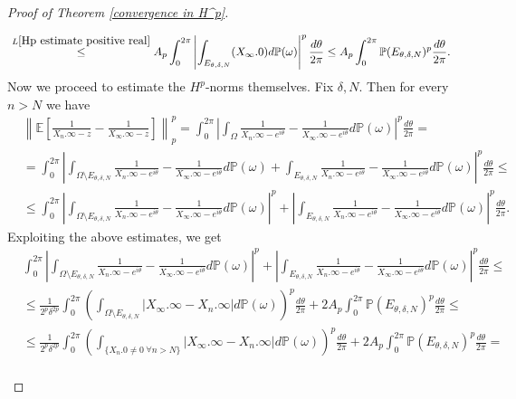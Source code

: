 \documentclass[11pt]{article}
\begin{document}
\begin{proof}[Proof of Theorem \ref{convergence in H^p}]
\begin{itemize}
\[\begin{aligned}
			& \stackrel{L \ref{Hp estimate positive real}}{\le} A_p \int_{0}^{2 \pi} \left| \int_{E_{\theta, \delta, N}} (X_{\infty}.0) d \mathbb{P}(\omega) \right|^p \frac{d\theta}{2 \pi} \le A_p \int_{0}^{2 \pi} \mathbb{P}( E_{\theta, \delta, N})^p \frac{d \theta}{2 \pi}.
		\end{aligned}
		\]
		Now we proceed to estimate the $H^p$-norms themselves. Fix $\delta, N$. Then for every $n > N$ we have
		\[
		\begin{aligned}
			& \left\| \mathbb{E} \left[\frac{1}{X_n.\infty - z} - \frac{1}{X_\infty.\infty - z}\right]  \right\|_p^p = \int_0^{2 \pi} \left| \int_{\Omega} \frac{1}{X_n.\infty - e^{i \theta}} - \frac{1}{X_\infty.\infty - e^{i \theta}} d \mathbb{P}(\omega) \right|^p \frac{d \theta}{2 \pi} = \\
			&= \int_0^{2 \pi} \left| \int_{\Omega \setminus E_{\theta, \delta, N}} \frac{1}{X_n.\infty - e^{i \theta}} - \frac{1}{X_\infty.\infty - e^{i \theta}} d \mathbb{P}(\omega) + \int_{E_{\theta, \delta, N}} \frac{1}{X_n.\infty - e^{i \theta}} - \frac{1}{X_\infty.\infty - e^{i \theta}} d \mathbb{P}(\omega) \right|^p \frac{d \theta}{2 \pi} \le \\
			& \le \int_0^{2 \pi} \left| \int_{\Omega \setminus E_{\theta, \delta, N}} \frac{1}{X_n.\infty - e^{i \theta}} - \frac{1}{X_\infty.\infty - e^{i \theta}} d \mathbb{P}(\omega) \right|^p + \left| \int_{E_{\theta, \delta, N}} \frac{1}{X_n.\infty - e^{i \theta}} - \frac{1}{X_\infty.\infty - e^{i \theta}} d \mathbb{P}(\omega) \right|^p \frac{d \theta}{2 \pi}.
		\end{aligned}
		\]
		Exploiting the above estimates, we get
		\[
		\begin{aligned}
			& \int_0^{2 \pi} \left| \int_{\Omega \setminus E_{\theta, \delta, N}} \frac{1}{X_n.\infty - e^{i \theta}} - \frac{1}{X_\infty.\infty - e^{i \theta}} d \mathbb{P}(\omega) \right|^p + \left| \int_{E_{\theta, \delta, N}} \frac{1}{X_n.\infty - e^{i \theta}} - \frac{1}{X_\infty.\infty - e^{i \theta}} d \mathbb{P}(\omega) \right|^p \frac{d \theta}{2 \pi} \le \\ 
			& \le \frac{1}{2^p\delta^{2p}} \int_0^{2 \pi} \left( \int_{\Omega \setminus E_{\theta, \delta, N}} |X_\infty.\infty - X_n.\infty| d \mathbb{P}(\omega) \right)^p \frac{d \theta}{2 \pi} + 2A_p \int_{0}^{2 \pi} \mathbb{P}( E_{\theta, \delta, N})^p \frac{d \theta}{2 \pi} \le \\ 
			& \le \frac{1}{2^p\delta^{2p}} \int_0^{2 \pi} \left( \int_{ \{ X_n.0 \ne 0 \ \forall n > N \} } |X_\infty.\infty - X_n.\infty| d \mathbb{P}(\omega) \right)^p \frac{d \theta}{2 \pi} + 2A_p \int_{0}^{2 \pi} \mathbb{P}( E_{\theta, \delta, N})^p \frac{d \theta}{2 \pi} = \\

\end{aligned}\]
\end{itemize}
\end{proof}
\end{document}
